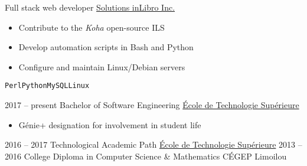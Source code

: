 \documentclass[9pt]{developercv} %
\begin{document}
\begin{minipage}[t]{0.8\textwidth}
\begin{entrylist}
		{Full stack web developer}
		{\href{https://inlibro.com/en/}{Solutions inLibro Inc.}}
		{
			\vspace{-14pt}
			\begin{itemize}
				\renewcommand{\labelitemi}{\raisebox{.45ex}{\rule{.6ex}{.6ex}}}
				\setlength\itemsep{-1pt}
				\item Contribute to the \emph{Koha} open-source ILS
				\item Develop automation scripts in Bash and Python
				\item Configure and maintain Linux/Debian servers
			\end{itemize}
			\vspace{-4pt}
			\texttt{Perl}\slashsep\texttt{Python}\slashsep\texttt{MySQL}\slashsep\texttt{Linux}
		}
\end{entrylist}



\begin{entrylist}
	\setlength\itemsep{-1pt}
	\entry
		{2017 -- present}
		{Bachelor of Software Engineering}
		{\href{https://etsmtl.ca}{École de Technologie Supérieure}}
		{
			\vspace{-14pt}
			\begin{itemize}
				\renewcommand{\labelitemi}{\raisebox{.45ex}{\rule{.6ex}{.6ex}}}
				\setlength\itemsep{-1pt}
				\item Génie+ designation for involvement in student life
			\end{itemize}
			\vspace{-8pt}
		}
	\entry
		{2016 -- 2017}
		{Technological Academic Path}
		{\href{https://etsmtl.ca}{École de Technologie Supérieure}}
		{\vspace{-14pt}}
	\entry
		{2013 -- 2016}
		{College Diploma in Computer Science \& Mathematics}
		{CÉGEP Limoilou}
		{\vspace{-14pt}}
\end{entrylist}




\end{minipage}
\end{document}
